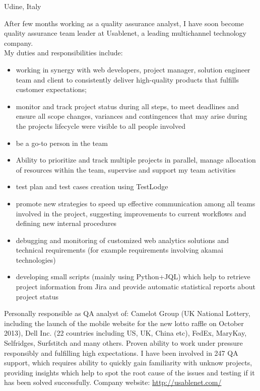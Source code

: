 \documentclass[10pt,a4paper]{moderncv}   %
\begin{document}
   {Udine, Italy}{}{After few months working as a quality assurance analyst, I
      have soon become
   quality assurance team leader at Usablenet, a leading multichannel technology
   company. 
   \\
   My duties and responsibilities  include:
   \begin{itemize}
\item 
  working in synergy with  web
   developers, project manager, solution engineer team and client to
   consistently deliver high-quality
   products that fulfills customer expectations;
\item monitor and track project status during all steps, to meet deadlines
   and ensure all scope changes,
 variances and contingences that may arise during the 
 projects lifecycle were visible to all people involved
 \item  be a go-to person in the team
 \item 
   Ability to prioritize and track multiple projects in parallel,
    manage  allocation of resources within the team, supervise and support my team
    activities
\item test plan and test cases creation using TestLodge
\item promote new strategies to speed up effective communication among all
   teams involved in the project, suggesting 
   improvements to current workflows and defining new internal procedures
\item debugging and monitoring of customized web analytics solutions and 
technical requirements (for example requirements involving
   akamai technologies)
   \item developing small scripts (mainly using Python+JQL) which help to retrieve project
 information from Jira and provide automatic statistical reports about project status
 \end{itemize} 
   Personally responsible as QA analyst of:
   Camelot Group (UK National Lottery, including the
   launch of the mobile website for the new lotto raffle on October 2013), Dell Inc. (22 countries
   including US, UK, China etc), FedEx,
   MaryKay, Selfridges, Surfstitch and many others.
   Proven ability to work under pressure responsibly and fulfilling high
   expectations.
I have been involved in 247 QA support, which requires ability to quickly gain
familiarity with unknow projects, providing insights which help to spot the root
cause of the issues and testing if it has
been solved successfully.
Company website: \url{http://usablenet.com/}}
\end{document}
